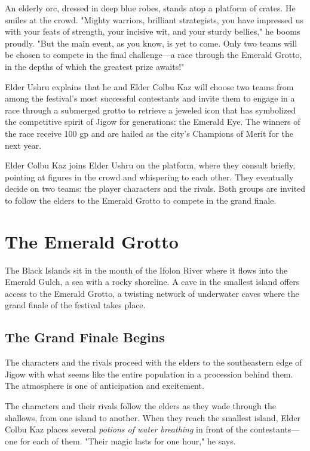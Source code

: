 \documentclass[a4paper, 11pt, bg=full, twocolumn, nooutline]{dndbook}
\begin{document}
\begin{DndReadAloud}
An elderly orc, dressed in deep blue robes, stands atop a platform of crates. He smiles at the crowd. "Mighty warriors, brilliant strategists, you have impressed us with your feats of strength, your incisive wit, and your sturdy bellies," he booms proudly. "But the main event, as you know, is yet to come. Only two teams will be chosen to compete in the final challenge---a race through the Emerald Grotto, in the depths of which the greatest prize awaits!"
\end{DndReadAloud}

Elder Ushru explains that he and Elder Colbu Kaz will choose two teams from among the festival's most successful contestants and invite them to engage in a race through a submerged grotto to retrieve a jeweled icon that has symbolized the competitive spirit of Jigow for generations: the Emerald Eye. The winners of the race receive 100 gp and are hailed as the city's Champions of Merit for the next year.

Elder Colbu Kaz joins Elder Ushru on the platform, where they consult briefly, pointing at figures in the crowd and whispering to each other. They eventually decide on two teams: the player characters and the rivals. Both groups are invited to follow the elders to the Emerald Grotto to compete in the grand finale.
\section{The Emerald Grotto}

The Black Islands sit in the mouth of the Ifolon River where it flows into the Emerald Gulch, a sea with a rocky shoreline. A cave in the smallest island offers access to the Emerald Grotto, a twisting network of underwater caves where the grand finale of the festival takes place.

\subsection{The Grand Finale Begins}

The characters and the rivals proceed with the elders to the southeastern edge of Jigow with what seems like the entire population in a procession behind them. The atmosphere is one of anticipation and excitement.

The characters and their rivals follow the elders as they wade through the shallows, from one island to another. When they reach the smallest island, Elder Colbu Kaz places several \textit{potions of water breathing} in front of the contestants---one for each of them. "Their magic lasts for one hour," he says.
\end{document}
